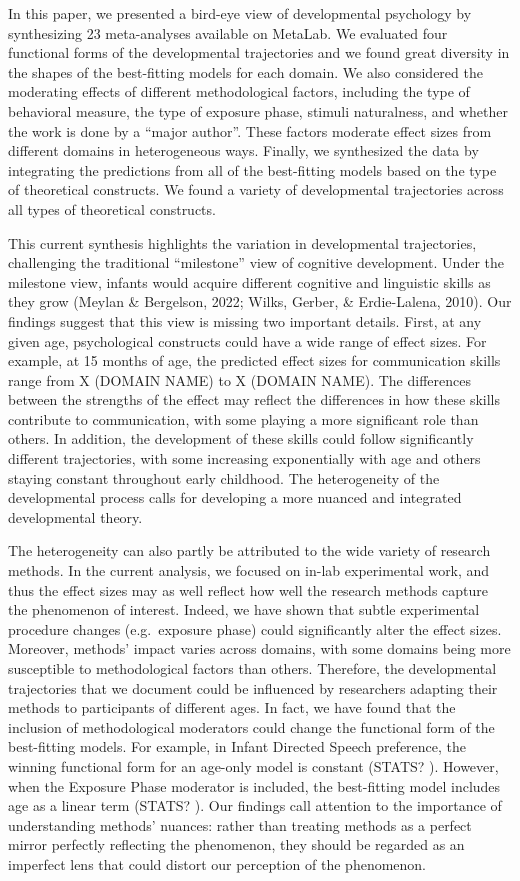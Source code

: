 \documentclass[10pt, letterpaper]{article}
\begin{document}
In this paper, we presented a bird-eye view of developmental psychology
by synthesizing 23 meta-analyses available on MetaLab. We evaluated four
functional forms of the developmental trajectories and we found great
diversity in the shapes of the best-fitting models for each domain. We
also considered the moderating effects of different methodological
factors, including the type of behavioral measure, the type of exposure
phase, stimuli naturalness, and whether the work is done by a ``major
author''. These factors moderate effect sizes from different domains in
heterogeneous ways. Finally, we synthesized the data by integrating the
predictions from all of the best-fitting models based on the type of
theoretical constructs. We found a variety of developmental trajectories
across all types of theoretical constructs.

This current synthesis highlights the variation in developmental
trajectories, challenging the traditional ``milestone'' view of
cognitive development. Under the milestone view, infants would acquire
different cognitive and linguistic skills as they grow (Meylan \&
Bergelson, 2022; Wilks, Gerber, \& Erdie-Lalena, 2010). Our findings
suggest that this view is missing two important details. First, at any
given age, psychological constructs could have a wide range of effect
sizes. For example, at 15 months of age, the predicted effect sizes for
communication skills range from X (DOMAIN NAME) to X (DOMAIN NAME). The
differences between the strengths of the effect may reflect the
differences in how these skills contribute to communication, with some
playing a more significant role than others. In addition, the
development of these skills could follow significantly different
trajectories, with some increasing exponentially with age and others
staying constant throughout early childhood. The heterogeneity of the
developmental process calls for developing a more nuanced and integrated
developmental theory.

The heterogeneity can also partly be attributed to the wide variety of
research methods. In the current analysis, we focused on in-lab
experimental work, and thus the effect sizes may as well reflect how
well the research methods capture the phenomenon of interest. Indeed, we
have shown that subtle experimental procedure changes (e.g.~exposure
phase) could significantly alter the effect sizes. Moreover, methods'
impact varies across domains, with some domains being more susceptible
to methodological factors than others. Therefore, the developmental
trajectories that we document could be influenced by researchers
adapting their methods to participants of different ages. In fact, we
have found that the inclusion of methodological moderators could change
the functional form of the best-fitting models. For example, in Infant
Directed Speech preference, the winning functional form for an age-only
model is constant (STATS? ). However, when the Exposure Phase moderator
is included, the best-fitting model includes age as a linear term
(STATS? ). Our findings call attention to the importance of
understanding methods' nuances: rather than treating methods as a
perfect mirror perfectly reflecting the phenomenon, they should be
regarded as an imperfect lens that could distort our perception of the
phenomenon.
\end{document}

